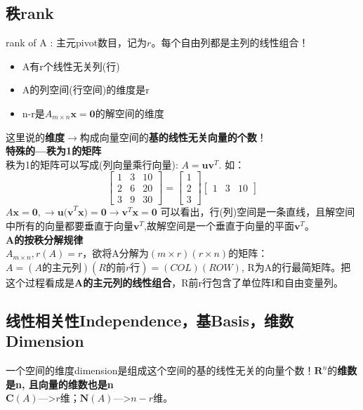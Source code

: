 \documentclass[UTF8]{article}
\begin{document}
    \subsection{秩rank}
    rank of A : 主元pivot数目，记为$r$。\quad 每个自由列都是主列的线性组合！
    \begin{itemize}
        \item A有r个线性无关列(行)
        \item A的列空间(行空间)的维度是r
        \item n-r是$A_{m\times n}\bm{x}=\bm{0}$的解空间的维度
    \end{itemize}
    这里说的\textbf{维度}$\rightarrow$构成向量空间的\textbf{基的线性无关向量的个数}！\\
    \textbf{特殊的---秩为1的矩阵}\\
    秩为1的矩阵可以写成(列向量乘行向量): $A=\bm{uv}^T$. \quad 如：
    $$
    \begin{bmatrix}
        1 & 3 & 10\\
        2 & 6 & 20\\
        3 & 9 & 30
    \end{bmatrix}
    =
    \begin{bmatrix}
        1\\
        2\\
        3
    \end{bmatrix}
    \begin{bmatrix}
        1 & 3 & 10
    \end{bmatrix}
    $$
    $A\bm{x}=\bm{0}, \rightarrow \bm{u(v}^T\bm{x})=\bm{0} \rightarrow \bm{v}^T\bm{x}=\bm{0}$
    可以看出，行(列)空间是一条直线，且解空间中所有的向量都要垂直于向量$\bm{v}^T$,故解空间是一个垂直于向量的平面$\bm{v}^T$。
    \\
    \textbf{A的按秩分解规律}\\
    $A_{m\times n}, r(A)=r$，欲将A分解为$(m\times r)(r \times n)$的矩阵：\\
    $A = (A \textbf{的主元列})(R的\textbf{前}r\textbf{行})=(COL)(ROW)$, R为A的行最简矩阵。把这个过程看成是\textbf{A的主元列的线性组合}，R前r行包含了单位阵I和自由变量列。

    \subsection{线性相关性Independence，基Basis，维数Dimension}
    一个空间的维度dimension是组成这个空间的基的线性无关的向量个数！$\mathbf{R}^{n}$的\textbf{维数是n, 且向量的维数也是n}\\
    $\mathbf{C}(A)$--->$r$维；$\mathbf{N}(A)$--->$n-r$维。\\
\end{document}
